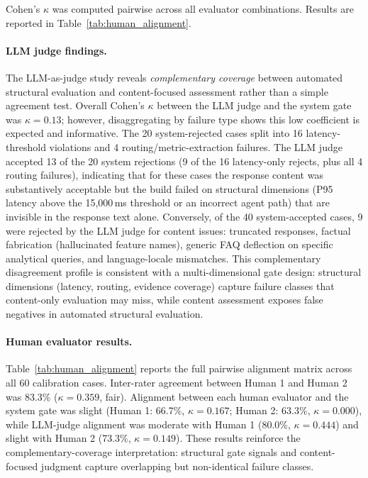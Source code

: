 Cohen's $\kappa$ \cite{landis1977kappa} was computed pairwise across all evaluator combinations. Results are reported in Table~\ref{tab:human_alignment}.



\paragraph{LLM judge findings.}
The LLM-as-judge study reveals \textit{complementary coverage} between automated structural evaluation and content-focused assessment rather than a simple agreement test. Overall Cohen's $\kappa$ between the LLM judge and the system gate was $\kappa = 0.13$; however, disaggregating by failure type shows this low coefficient is expected and informative. The 20 system-rejected cases split into 16 latency-threshold violations and 4 routing/metric-extraction failures. The LLM judge accepted 13 of the 20 system rejections (9 of the 16 latency-only rejects, plus all 4 routing failures), indicating that for these cases the response content was substantively acceptable but the build failed on structural dimensions (P95 latency above the 15{,}000\,ms threshold or an incorrect agent path) that are invisible in the response text alone. Conversely, of the 40 system-accepted cases, 9 were rejected by the LLM judge for content issues: truncated responses, factual fabrication (hallucinated feature names), generic FAQ deflection on specific analytical queries, and language-locale mismatches. This complementary disagreement profile is consistent with a multi-dimensional gate design: structural dimensions (latency, routing, evidence coverage) capture failure classes that content-only evaluation may miss, while content assessment exposes false negatives in automated structural evaluation.

\paragraph{Human evaluator results.}
Table~\ref{tab:human_alignment} reports the full pairwise alignment matrix across all 60 calibration cases. Inter-rater agreement between Human 1 and Human 2 was 83.3\% ($\kappa = 0.359$, fair). Alignment between each human evaluator and the system gate was slight (Human 1: 66.7\%, $\kappa = 0.167$; Human 2: 63.3\%, $\kappa = 0.000$), while LLM-judge alignment was moderate with Human 1 (80.0\%, $\kappa = 0.444$) and slight with Human 2 (73.3\%, $\kappa = 0.149$). These results reinforce the complementary-coverage interpretation: structural gate signals and content-focused judgment capture overlapping but non-identical failure classes.

